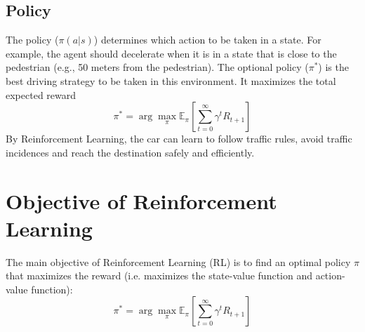 \documentclass{article} %
\begin{document}
\subsection{Policy}
The policy (\({\pi}(a | s)\)) determines which action to be taken in a state. For example, the agent should decelerate when it is in a state that is close to the pedestrian (e.g., 50 meters from the pedestrian).
The optional policy (\(\pi^{*}\)) is the best driving strategy to be taken in this environment. It maximizes the total expected reward
\[
\pi^{*} = \arg \max_{\pi} \mathbb{E}_{\pi} \left[ \sum_{t=0}^{\infty} \gamma^t R_{t+1} \right]
\]
By Reinforcement Learning, the car can learn to follow traffic rules, avoid traffic incidences and reach the destination safely and efficiently. 

\section{Objective of Reinforcement Learning}
The main objective of Reinforcement Learning (RL) is to find an optimal policy $\pi$ that maximizes the reward (i.e. maximizes the state-value function and action-value function):
\[
\pi^{*} = \arg \max_{\pi} \mathbb{E}_{\pi} \left[ \sum_{t=0}^{\infty} \gamma^t R_{t+1} \right]
\]



\end{document}
